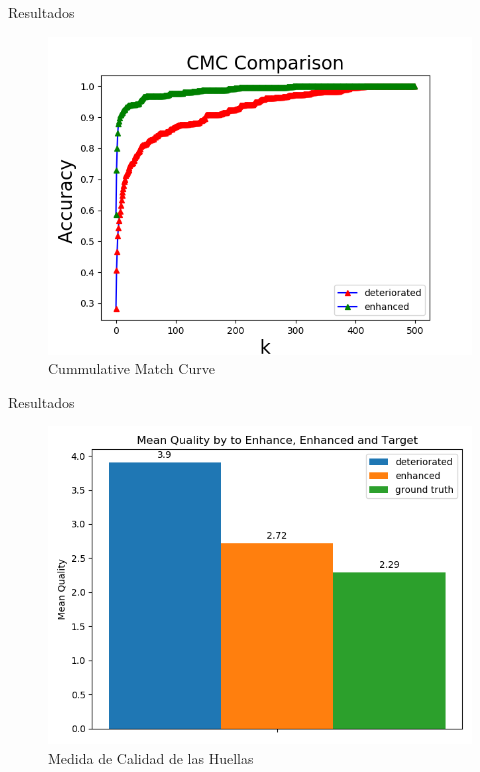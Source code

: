 \documentclass[12pt]{beamer}
\begin{document}
\begin{frame}{Resultados}

    \begin{figure}[h]
        \includegraphics[scale=0.56]{figs/cmc_comparison.png}
        \caption{Cummulative Match Curve}
    \end{figure}
    
\end{frame}

\begin{frame}{Resultados}

    \begin{figure}[h]
        \includegraphics[scale=0.56]{figs/mean_qualities.png}
        \caption{Medida de Calidad de las Huellas}
    \end{figure}
    
\end{frame}
\end{document}
